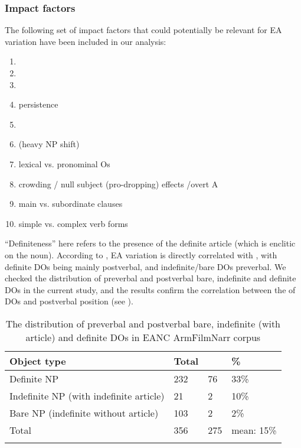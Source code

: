 \documentclass[output=paper,colorlinks,citecolor=brown,draftmode]{langscibook}
\begin{document}
\subsubsection{Impact factors}\label{Armenian:ss:3.2.2}

The following set of impact factors that could potentially be relevant for EA  variation have been included in our analysis:

\begin{enumerate}%
    \item {}
    \item {}
    \item {}
    \item {} persistence 
    \item {}
    \item {} (heavy NP shift)
    \item lexical vs. pronominal Os
    \item crowding / null subject (pro-dropping) effects /overt A
    \item main vs. subordinate clauses
    \item simple vs. complex verb forms
\end{enumerate}



``Definiteness'' here refers to the presence of the definite article (which is enclitic on the noun). According to \citet{samvelian_persistence_2023}, EA  variation is directly correlated with , with definite DOs being mainly postverbal, and indefinite/bare DOs preverbal.  We checked the distribution of preverbal and postverbal bare, indefinite and definite DOs in the current study, and the results confirm the correlation between the  of DOs and postverbal position (see ).

 \begin{table}
    \begin{tabularx}{.8\textwidth}{lYYY}
\lsptoprule
Object type & Total &  & \%  \\
\midrule
Definite NP & 232 & 76 & 33\% \\
Indefinite NP (with indefinite article) & 21 & 2 & 10\% \\
Bare NP (indefinite without article) & 103 & 2 & 2\% \\
\midrule
Total & 356\footnotemark & 275 & mean: 15\% \\
\lspbottomrule
    \end{tabularx}
    \caption{The distribution of preverbal and postverbal bare, indefinite (with article) and definite DOs in EANC ArmFilmNarr corpus}
    \label{Armenian:tab:4}
\end{table}
\end{document}
